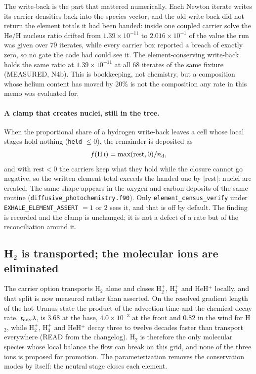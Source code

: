 \documentclass[english,a4paper]{my_memo}
\begin{document}
The write-back is the part that mattered numerically. Each Newton iterate
writes its carrier densities back into the species vector, and the old
write-back did not return the element totals it had been handed: inside one
coupled carrier solve the He/H nucleus ratio drifted from
$1.39\times10^{-11}$ to $2.016\times10^{-1}$ of the value the run was given
over $79$ iterates, while every carrier box reported a breach of exactly
zero, so no gate the code had could see it. The element-conserving write-back
holds the same ratio at $1.39\times10^{-11}$ at all $68$ iterates of the same
fixture (MEASURED, N4b). This is bookkeeping, not chemistry, but a
composition whose helium content has moved by $20\%$ is not the composition
any rate in this memo was evaluated for.

\paragraph{A clamp that creates nuclei, still in the tree.} When the
proportional share of a hydrogen write-back leaves a cell whose local stages
hold nothing (\texttt{held} $\le 0$), the remainder is deposited as
\[
   f({\rm H\,\textsc{i}}) = \max(\text{rest}, 0)/n_{\rm d},
\]
and with $\text{rest} < 0$ the carriers keep what they hold while the closure
cannot go negative, so the written element total exceeds the handed one by
$|\text{rest}|$: nuclei are created. The same shape appears in the oxygen and
carbon deposits of the same routine
(\texttt{diffusive\_\allowbreak photochemistry.\allowbreak f90}). Only
\texttt{element\_census\_verify} under \texttt{EXHALE\_ELEMENT\_ASSERT} $=1$
or $2$ sees it, and that is off by default. The finding is recorded and the
clamp is unchanged; it is not a defect of a rate but of the reconciliation
around it.

\subsection{H$_2$ is transported; the molecular ions are eliminated}

The carrier option transports H$_2$ alone and closes H$_2^+$, H$_3^+$ and
HeH$^+$ locally, and that split is now measured rather than asserted. On the
resolved gradient length of the hot-Uranus state the product of the advection
time and the chemical decay rate, $t_{\rm adv}\lambda$, is $3.68$ at the
base, $4.0\times10^{-3}$ at the front and $0.82$ in the wind for H$_2$, while
H$_2^+$, H$_3^+$ and HeH$^+$ decay three to twelve decades faster than
transport everywhere (READ from the changelog). H$_2$ is therefore the only molecular species whose local balance the
flow can break on this grid, and none of the three ions is proposed for
promotion. The parameterization removes the conservation modes by itself: the
neutral stage closes each element.
\end{document}

